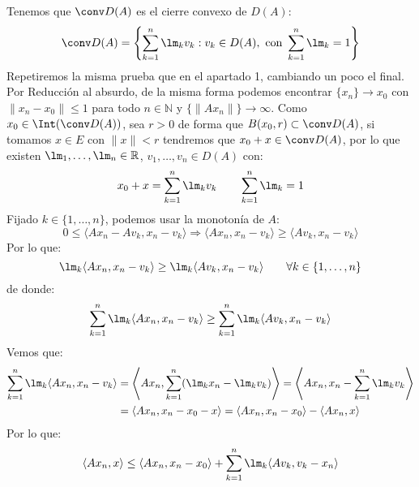 \begin{ejercicio}
\begin{enumerate}
            Tenemos que $\conv D(A)$ es el cierre convexo de $D(A)$:
            \begin{equation*}
                \conv D(A) = \left\{\sum_{k=1}^{n}\lm_k v_k : v_k \in D(A), \text{\ con\ } \sum_{k=1}^{n}\lm_k = 1\right\}
            \end{equation*}
            Repetiremos la misma prueba que en el apartado 1, cambiando un poco el final. Por Reducción al absurdo, de la misma forma podemos encontrar $\{x_n\}\to x_0$ con $\|x_n-x_0\| \leq 1$ para todo $n\in \mathbb{N}$ y $\{\|Ax_n\|\}\to \infty$. Como $x_0\in \Int(\conv D(A))$, sea $r>0$ de forma que $B(x_0,r)\subset \conv D(A)$, si tomamos $x\in E$ con $\|x\|<r$ tendremos que $x_0+x\in \conv D(A)$, por lo que existen $\lm_1,\ldots,\lm_n\in \mathbb{R}$, $v_1,\ldots, v_n\in D(A)$ con:
            \begin{equation*}
                x_0 + x = \sum_{k=1}^{n} \lm_k v_k \qquad \sum_{k=1}^{n}\lm_k = 1
            \end{equation*}
            Fijado $k\in \{1,\ldots,n\}$, podemos usar la monotonía de $A$:
            \begin{equation*}
                0\leq \langle Ax_n - Av_k, x_n - v_k \rangle  \Longrightarrow \langle Ax_n,x_n-v_k \rangle  \geq \langle Av_k, x_n-v_k \rangle 
            \end{equation*}
            Por lo que:
            \begin{equation*}
                \lm_k \langle Ax_n,x_n-v_k \rangle  \geq \lm_k\langle Av_k, x_n-v_k \rangle \qquad \forall k \in \{1,\ldots,n\}
            \end{equation*}
            de donde:
            \begin{equation*}
                \sum_{k=1}^{n}\lm_k \langle Ax_n,x_n-v_k \rangle  \geq\sum_{k=1}^{n} \lm_k\langle Av_k, x_n-v_k \rangle 
            \end{equation*}
            Vemos que:
            \begin{align*}
                \sum_{k=1}^{n}\lm_k \langle Ax_n,x_n-v_k \rangle   &= \left\langle Ax_n, \sum_{k=1}^{n}(\lm_kx_n-\lm_kv_k) \right\rangle  = \left\langle Ax_n, x_n - \sum_{k=1}^{n}\lm_kv_k \right\rangle  \\ &= \langle Ax_n, x_n - x_0-x\rangle  = \langle Ax_n, x_n-x_0 \rangle  - \langle Ax_n, x \rangle 
            \end{align*}
            Por lo que:
            \begin{align*}
                \langle Ax_n,x \rangle &\leq \langle Ax_n, x_n-x_0 \rangle + \sum_{k=1}^{n}\lm_k\langle Av_k, v_k - x_n \rangle  \\

\end{align*}
\end{enumerate}
\end{ejercicio}
